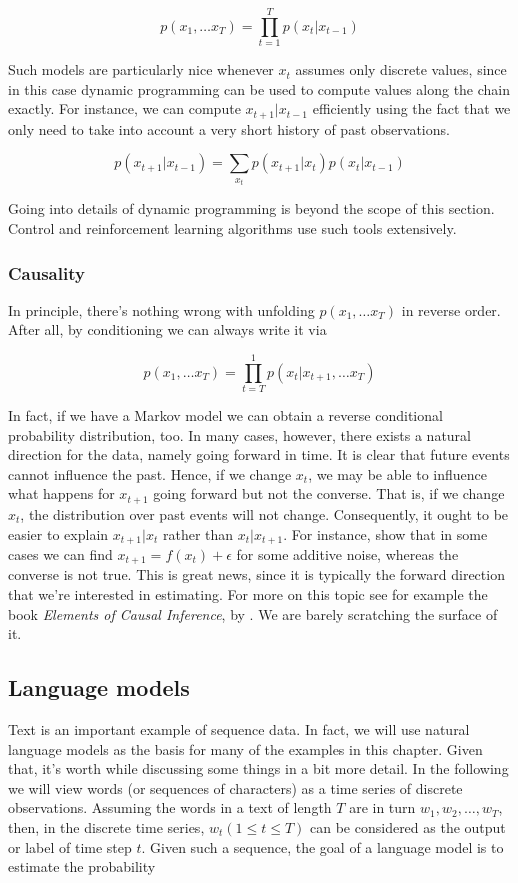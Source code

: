 $$p(x_1, \ldots x_T) = \prod_{t=1}^T p(x_t|x_{t-1})$$

Such models are particularly nice whenever $x_t$ assumes only discrete values, since in this case dynamic programming can be used to compute values along the chain exactly. For instance, we can compute $x_{t+1}|x_{t-1}$ efficiently using the fact that we only need to take into account a very short history of past observations.

$$p(x_{t+1}|x_{t-1}) = \sum_{x_t} p(x_{t+1}|x_t) p(x_t|x_{t-1})$$

Going into details of dynamic programming is beyond the scope of this section. Control and reinforcement learning algorithms use such tools extensively.

\subsubsection{Causality}

In principle, there’s nothing wrong with unfolding $p(x_1, \ldots x_T)$ in reverse order. After all, by conditioning we can always write it via

$$p(x_1, \ldots x_T) = \prod_{t=T}^1 p(x_t|x_{t+1}, \ldots x_T)$$

In fact, if we have a Markov model we can obtain a reverse conditional probability distribution, too. In many cases, however, there exists a natural direction for the data, namely going forward in time. It is clear that future events cannot influence the past. Hence, if we change $x_t$, we may be able to influence what happens for $x_{t+1}$ going forward but not the converse. That is, if we change $x_t$, the distribution over past events will not change. Consequently, it ought to be easier to explain $x_{t+1}|x_t$ rather than $x_t|x_{t+1}$. For instance, \citet{Hoyer2009} show that in some cases we can find $x_{t+1} = f(x_t) + \epsilon$ for some additive noise, whereas the converse is not true. This is great news, since it is typically the forward direction that we’re interested in estimating. For more on this topic see for example the book \textit{Elements of Causal Inference}, by \citet{Peters2015}. We are barely scratching the surface of it.

\subsection{Language models}

Text is an important example of sequence data. In fact, we will use natural language models as the basis for many of the examples in this chapter. Given that, it’s worth while discussing some things in a bit more detail. In the following we will view words (or sequences of characters) as a time series of discrete observations. Assuming the words in a text of length $T$ are in turn $w_1, w_2, \ldots, w_T$, then, in the discrete time series, $w_t(1 \leq t \leq T)$ can be considered as the output or label of time step $t$. Given such a sequence, the goal of a language model is to estimate the probability

